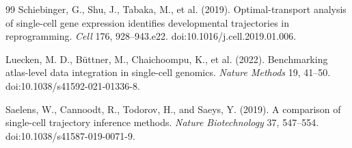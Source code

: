\documentclass[11pt]{article}
\begin{document}
\begin{thebibliography}{99}
Schiebinger, G., Shu, J., Tabaka, M., et al. (2019).
Optimal-transport analysis of single-cell gene expression identifies developmental trajectories in reprogramming.
\emph{Cell} 176, 928--943.e22.
doi:10.1016/j.cell.2019.01.006.

Luecken, M. D., B\"uttner, M., Chaichoompu, K., et al. (2022).
Benchmarking atlas-level data integration in single-cell genomics.
\emph{Nature Methods} 19, 41--50.
doi:10.1038/s41592-021-01336-8.

Saelens, W., Cannoodt, R., Todorov, H., and Saeys, Y. (2019).
A comparison of single-cell trajectory inference methods.
\emph{Nature Biotechnology} 37, 547--554.
doi:10.1038/s41587-019-0071-9.

\end{thebibliography}
\end{document}
